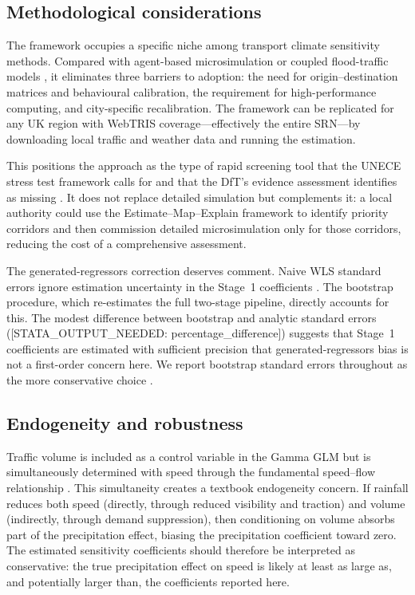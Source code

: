 \documentclass[review]{elsarticle}
\begin{document}
\subsection{Methodological considerations}
\label{sec:disc:method}

The framework occupies a specific niche among transport climate sensitivity methods. Compared with agent-based microsimulation \citep{huang2022overview,he2026flood} or coupled flood-traffic models \citep{pregnolato2017depth,pregnolato2016impact,farahmand2024integrating}, it eliminates three barriers to adoption: the need for origin--destination matrices and behavioural calibration, the requirement for high-performance computing, and city-specific recalibration. The framework can be replicated for any UK region with WebTRIS coverage---effectively the entire SRN---by downloading local traffic and weather data and running the estimation.

This positions the approach as the type of rapid screening tool that the UNECE stress test framework calls for \citep{unece2024stress} and that the DfT's evidence assessment identifies as missing \citep{dft2024rea}. It does not replace detailed simulation but complements it: a local authority could use the Estimate--Map--Explain framework to identify priority corridors and then commission detailed microsimulation only for those corridors, reducing the cost of a comprehensive assessment.

The generated-regressors correction deserves comment. Naive WLS standard errors ignore estimation uncertainty in the Stage~1 coefficients \citep{pagan1984econometric}. The bootstrap procedure, which re-estimates the full two-stage pipeline, directly accounts for this. The modest difference between bootstrap and analytic standard errors ([STATA\_OUTPUT\_NEEDED: percentage\_difference]) suggests that Stage~1 coefficients are estimated with sufficient precision that generated-regressors bias is not a first-order concern here. We report bootstrap standard errors throughout as the more conservative choice \citep{murphy1985estimation}.

\subsection{Endogeneity and robustness}
\label{sec:disc:endogeneity}

Traffic volume is included as a control variable in the Gamma GLM but is simultaneously determined with speed through the fundamental speed--flow relationship \citep{greenshields1935study}. This simultaneity creates a textbook endogeneity concern. If rainfall reduces both speed (directly, through reduced visibility and traction) and volume (indirectly, through demand suppression), then conditioning on volume absorbs part of the precipitation effect, biasing the precipitation coefficient toward zero. The estimated sensitivity coefficients should therefore be interpreted as conservative: the true precipitation effect on speed is likely at least as large as, and potentially larger than, the coefficients reported here.
\end{document}
